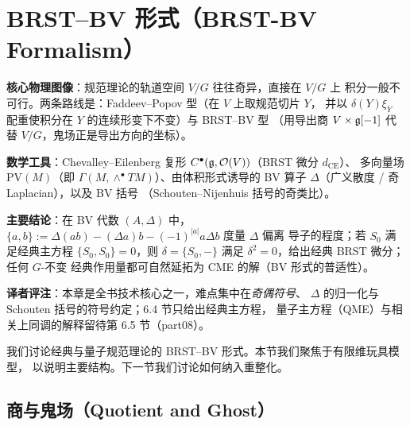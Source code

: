 

\section{BRST--BV 形式（BRST-BV Formalism）}

\begin{keypoints}
  \item \textbf{核心物理图像}：规范理论的轨道空间 $V/G$ 往往奇异，直接在 $V/G$ 上
        积分一般不可行。两条路线是：Faddeev--Popov 型（在 $V$ 上取规范切片 $Y$，
        并以 $\delta(Y)\xi_Y$ 配重使积分在 $Y$ 的连续形变下不变）与 BRST--BV 型
        （用导出商 $V\times\mathfrak{g}[-1]$ 代替 $V/G$，鬼场正是导出方向的坐标）。
  \item \textbf{数学工具}：Chevalley--Eilenberg 复形
        $C^{\bullet}(\mathfrak{g},\mathcal{O}(V))$（BRST 微分 $d_{\mathrm{CE}}$）、
        多向量场 $\mathrm{PV}(M)$（即 $\Gamma(M,\wedge^{\bullet}TM)$）、由体积形式诱导的
        BV 算子 $\Delta$（广义散度 / 奇 Laplacian），以及 BV 括号
        （Schouten--Nijenhuis 括号的奇类比）。
  \item \textbf{主要结论}：在 BV 代数 $(A,\Delta)$ 中，
        $\{a,b\}:=\Delta(ab)-(\Delta a)b-(-1)^{|a|}a\Delta b$ 度量 $\Delta$ 偏离
        导子的程度；若 $S_0$ 满足经典主方程 $\{S_0,S_0\}=0$，则
        $\delta=\{S_0,-\}$ 满足 $\delta^2=0$，给出经典 BRST 微分；任何 $G$-不变
        经典作用量都可自然延拓为 CME 的解（BV 形式的普适性）。
  \item \textbf{译者评注}：本章是全书技术核心之一，难点集中在\emph{奇偶符号}、
        $\Delta$ 的归一化与 Schouten 括号的符号约定；6.4 节只给出经典主方程，
        量子主方程（QME）与相关上同调的解释留待第 6.5 节（part08）。
\end{keypoints}

我们讨论经典与量子规范理论的 BRST--BV 形式。本节我们聚焦于有限维玩具模型，
以说明主要结构。下一节我们讨论如何纳入重整化。

\subsection{商与鬼场（Quotient and Ghost）}

